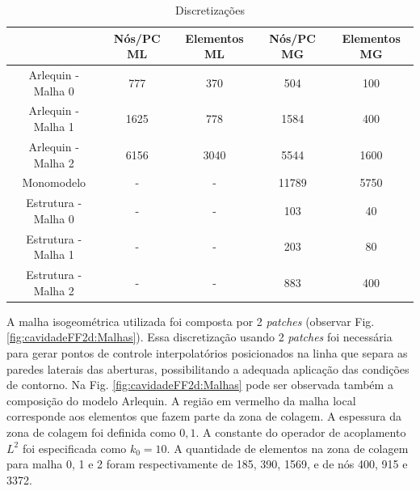 \documentclass[tese_patricia]{subfiles}
\begin{document}
	\begin{center}
		\begin{table}[h!]
			\caption{Discretizações}
			\centering
			\begin{tabular}{|c | c | c| c| c|} 
				\hline
				\ &  Nós/PC ML & Elementos ML & Nós/PC MG & Elementos MG  \\ 
				\hline
				Arlequin - Malha 0 & 777 & 370 & 504 & 100 \\ 
				\hline
				Arlequin - Malha 1 & 1625 & 778 & 1584 & 400\\
				\hline
				Arlequin - Malha 2 & 6156 & 3040 & 5544 & 1600\\
				\hline
				Monomodelo & - & - & 11789 & 5750\\
				\hline
				Estrutura - Malha 0 & - & - &  103 & 40\\
				\hline
				Estrutura - Malha 1 & - & - &  203 & 80\\
				\hline
				Estrutura - Malha 2 & - & - &  883 & 400\\
				\hline
			\end{tabular}
			\label{tab:CF2DD}
		\end{table}
	\end{center}


A malha isogeométrica utilizada foi composta por 2 \textit{patches} (observar Fig. \ref{fig:cavidadeFF2d:Malhas}). Essa discretização usando 2 \textit{patches} foi necessária para gerar pontos de controle interpolatórios posicionados na linha que separa as paredes laterais das aberturas, possibilitando a adequada aplicação das condições de contorno. Na Fig. \ref{fig:cavidadeFF2d:Malhas} pode ser observada também a composição do modelo Arlequin. A região em vermelho da malha local corresponde aos elementos que fazem parte da zona de colagem.  A espessura da zona de colagem foi definida como $0,1$. A constante do operador de acoplamento $L^{2}$ foi especificada como $k_{0} = 10$. A quantidade de elementos na zona de colagem para malha 0, 1 e 2  foram respectivamente de 185, 390, 1569, e de nós 400, 915 e 3372.
\end{document}
